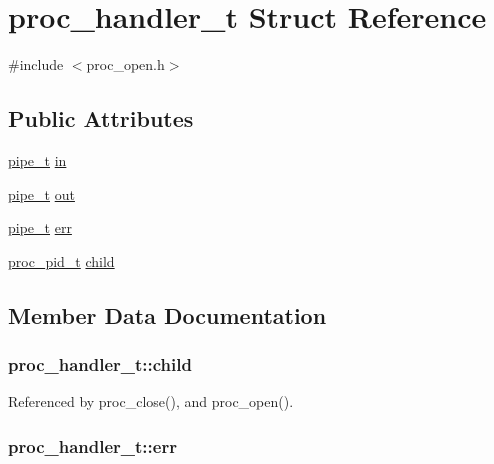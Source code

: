 \hypertarget{structproc__handler__t}{\section{proc\-\_\-handler\-\_\-t Struct Reference}
\label{structproc__handler__t}
}


{\ttfamily \#include $<$proc\-\_\-open.\-h$>$}

\subsection*{Public Attributes}
\begin{DoxyCompactItemize}
\item 
\hyperlink{structpipe__t}{pipe\-\_\-t} \hyperlink{structproc__handler__t_af604107ad35c078cd3bd12dac8ba7344}{in}
\item 
\hyperlink{structpipe__t}{pipe\-\_\-t} \hyperlink{structproc__handler__t_a7d16989b9886bfbfc0bfd1213c144361}{out}
\item 
\hyperlink{structpipe__t}{pipe\-\_\-t} \hyperlink{structproc__handler__t_ab348ffe73600b4d61a26e065639f96eb}{err}
\item 
\hyperlink{proc__open_8h_abff97f07c303cbb0f2c4399aee67bd11}{proc\-\_\-pid\-\_\-t} \hyperlink{structproc__handler__t_a5046354f0877eea8392067860a92f89b}{child}
\end{DoxyCompactItemize}


\subsection{Member Data Documentation}
\hypertarget{structproc__handler__t_a5046354f0877eea8392067860a92f89b}{
\subsubsection[{child}]{ proc\-\_\-handler\-\_\-t\-::child}}\label{structproc__handler__t_a5046354f0877eea8392067860a92f89b}


Referenced by proc\-\_\-close(), and proc\-\_\-open().

\hypertarget{structproc__handler__t_ab348ffe73600b4d61a26e065639f96eb}{
\subsubsection[{err}]{ proc\-\_\-handler\-\_\-t\-::err}}\label{structproc__handler__t_ab348ffe73600b4d61a26e065639f96eb}


